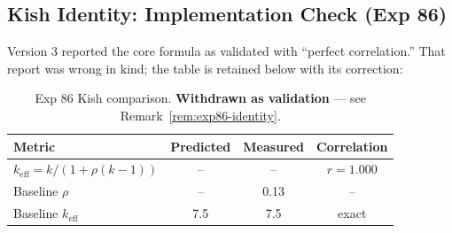 \documentclass[11pt,a4paper]{article}
\theoremstyle{definition}
\theoremstyle{remark}
\newcommand{\keff}{k_{\text{eff}}}
\begin{document}
\subsection{Kish Identity: Implementation Check (Exp 86)}
\label{sec:kish-implementation}

Version 3 reported the core formula as validated with ``perfect correlation.'' That report was wrong in kind; the table is retained below with its correction:

\begin{table}[H]
\centering
\begin{tabular}{lccc}
\toprule
\textbf{Metric} & \textbf{Predicted} & \textbf{Measured} & \textbf{Correlation} \\
\midrule
$\keff = k/(1+\rho(k-1))$ & -- & -- & $r = 1.000$ \\
Baseline $\rho$ & -- & 0.13 & -- \\
Baseline $\keff$ & 7.5 & 7.5 & exact \\
\bottomrule
\end{tabular}
\caption{Exp 86 Kish comparison. \textbf{Withdrawn as validation} --- see Remark~\ref{rem:exp86-identity}.}
\end{table}
\end{document}
